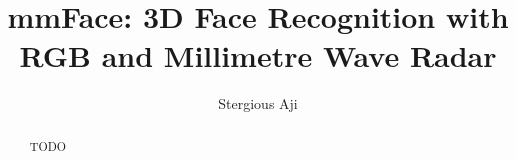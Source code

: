 \documentclass{mpaper}
\begin{document}
\title{mmFace: 3D Face Recognition with RGB and Millimetre Wave Radar}
\author{Stergious Aji}

\maketitle

\begin{abstract}
    TODO


\end{abstract}


\end{document}
